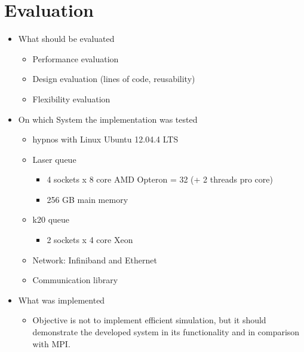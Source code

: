 \chapter{Evaluation}
\label{sec:evaluation}



\begin{itemize}

\item What should be evaluated
  \begin{itemize}
  \item Performance evaluation
  \item Design evaluation (lines of code, reusability)
  \item Flexibility evaluation
  \end{itemize}

\item On which System the implementation was tested
  \begin{itemize}
  \item hypnos with Linux Ubuntu 12.04.4 LTS
  \item Laser queue
    \begin{itemize}
    \item 4 sockets x 8 core AMD Opteron = 32 (+ 2 threads pro core)
    \item 256 GB main memory
    \end{itemize}
  \item k20 queue
    \begin{itemize}
    \item 2 sockets x 4 core Xeon
    \end{itemize}
  \item Network: Infiniband and Ethernet
  \item Communication library
  \end{itemize}

\item What was implemented
  \begin{itemize}
  \item Objective is not to implement efficient simulation, but
    it should demonstrate the developed system in its functionality
    and in comparison with MPI.
    

\end{itemize}
\end{itemize}
